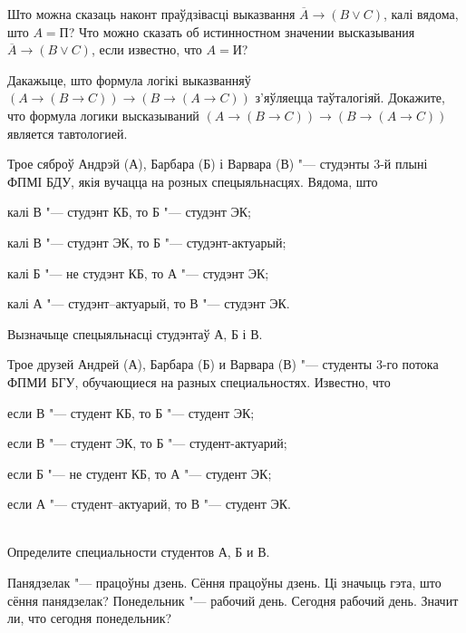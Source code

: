 \begin{problemList}

\problemItemSimple
{Што можна сказаць наконт праўдзівасці выказвання $\overline{A} \to (B \vee C)$, калі вядома, што $A = \mbox{П}$?}
{Что можно сказать об истинностном значении высказывания $\overline{A} \to (B \vee C)$, если известно, что $A = \mbox{И}$?}

\bigskip

\problemItemSimple
{Дакажыце, што формула логікі выказванняў $(A \to (B \to C)) \to (B \to (A \to C))$ з'яўляецца таўталогіяй.}
{Докажите, что формула логики высказываний $(A \to (B \to C)) \to (B \to (A \to C))$ является тавтологией.}

\bigskip

\problemItemSimple
{Трое сяброў Андрэй (А), Барбара (Б) і Варвара (В) "--- студэнты 3-й плыні ФПМІ БДУ, якія вучацца на розных спецыяльнасцях. Вядома, што
\begin{belarusianEnumerate}
	\item калі В "--- студэнт КБ, то Б "--- студэнт ЭК;
	\item калі В "--- студэнт ЭК, то Б "--- студэнт-актуарый;
	\item калі Б "--- не студэнт КБ, то А "--- студэнт ЭК;
	\item калі А "--- студэнт–актуарый, то В "--- студэнт ЭК.
\end{belarusianEnumerate}

\vspace{-8pt}
Вызначыце спецыяльнасці студэнтаў А, Б і В.}
{Трое друзей Андрей (А), Барбара (Б) и Варвара (В) "--- студенты 3-го потока ФПМИ БГУ, обучающиеся на разных специальностях. Известно, что
\begin{russianEnumerate}
	\item если В "--- студент КБ, то Б "--- студент ЭК;
	\item если В "--- студент ЭК, то Б "--- студент-актуарий;
	\item если Б "--- не студент КБ, то А "--- студент ЭК;
	\item если А "--- студент–актуарий, то В "--- студент ЭК.
\end{russianEnumerate}\\
Определите специальности студентов А, Б и В.}

\bigskip

\problemItemSimple
{Панядзелак "--- працоўны дзень. Сёння працоўны дзень. Ці значыць гэта, што сёння панядзелак?}
{Понедельник "--- рабочий день. Сегодня рабочий день. Значит ли, что сегодня понедельник?}


\end{problemList}
